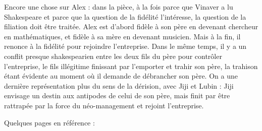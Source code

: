 \documentclass[a4paper,12pt]{book}
\begin{document}
\par Encore une chose sur Alex : dans la pièce, à la fois parce que Vinaver a lu Shakespeare et parce que la question de la fidélité l'intéresse, la question de la filiation doit être traitée. Alex est d'abord fidèle à son père en devenant chercheur en mathématiques, et fidèle à sa mère en devenant musicien. Mais à la fin, il renonce à la fidélité pour rejoindre l'entreprise. Dans le même temps, il y a un conflit presque shakespearien entre les deux fils du père pour contrôler l'entreprise, le fils illégitime finissant par l'emporter et trahir son père, la trahison étant évidente au moment où il demande de débrancher son père. On a une dernière représentation plus du sens de la dérision, avec Jiji et Lubin : Jiji envisage un destin aux antipodes de celui de son père, mais finit par être rattrapée par la force du néo-management et rejoint l'entreprise.
\par Quelques pages en référence :
\end{document}
